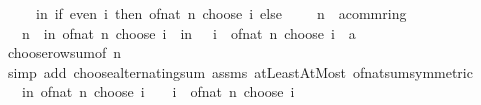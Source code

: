 \begin{isabellebody}
\ \ \ {\isachardoublequoteopen}{}\ {\isacharasterisk}{\kern0pt}\ {\isacharparenleft}{\kern0pt}{\isasymSum}i{\isasymle}n{\isachardot}{\kern0pt}\ if\ even\ i\ then\ of{\isacharunderscore}{\kern0pt}nat\ {\isacharparenleft}{\kern0pt}n\ choose\ i{\isacharparenright}{\kern0pt}\ else\ {}{\isacharparenright}{\kern0pt}\ {\isacharequal}{\kern0pt}\ {\isacharparenleft}{\kern0pt}{}\ {\isacharcircum}{\kern0pt}\ n\ {\isacharcolon}{\kern0pt}{\isacharcolon}{\kern0pt}\ {\isacharprime}{\kern0pt}a{\isacharcolon}{\kern0pt}{\isacharcolon}{\kern0pt}comm{\isacharunderscore}{\kern0pt}ring{\isacharunderscore}{\kern0pt}{}{\isacharparenright}{\kern0pt}{\isachardoublequoteclose}\isanewline
%
\isadelimproof
%
\endisadelimproof
%
\isatagproof
{}\isamarkupfalse%
\ {\isacharminus}{\kern0pt}\isanewline
\ \ \isamarkupfalse%
\ {\isachardoublequoteopen}{}\ {\isacharcircum}{\kern0pt}\ n\ {\isacharequal}{\kern0pt}\ {\isacharparenleft}{\kern0pt}{\isasymSum}i{\isasymle}n{\isachardot}{\kern0pt}\ of{\isacharunderscore}{\kern0pt}nat\ {\isacharparenleft}{\kern0pt}n\ choose\ i{\isacharparenright}{\kern0pt}{\isacharparenright}{\kern0pt}\ {\isacharplus}{\kern0pt}\ {\isacharparenleft}{\kern0pt}{\isasymSum}i{\isasymle}n{\isachardot}{\kern0pt}\ {\isacharparenleft}{\kern0pt}{\isacharminus}{\kern0pt}{}{\isacharparenright}{\kern0pt}\ {\isacharcircum}{\kern0pt}\ i\ {\isacharasterisk}{\kern0pt}\ of{\isacharunderscore}{\kern0pt}nat\ {\isacharparenleft}{\kern0pt}n\ choose\ i{\isacharparenright}{\kern0pt}\ {\isacharcolon}{\kern0pt}{\isacharcolon}{\kern0pt}\ {\isacharprime}{\kern0pt}a{\isacharparenright}{\kern0pt}{\isachardoublequoteclose}\isanewline
\ \ \ \ \isamarkupfalse%
\ choose{\isacharunderscore}{\kern0pt}row{\isacharunderscore}{\kern0pt}sum{\isacharbrackleft}{\kern0pt}of\ n{\isacharbrackright}{\kern0pt}\isanewline
\ \ \ \ \isamarkupfalse%
\ {\isacharparenleft}{\kern0pt}simp\ add{\isacharcolon}{\kern0pt}\ choose{\isacharunderscore}{\kern0pt}alternating{\isacharunderscore}{\kern0pt}sum\ assms\ atLeast{}AtMost\ of{\isacharunderscore}{\kern0pt}nat{\isacharunderscore}{\kern0pt}sum{\isacharbrackleft}{\kern0pt}symmetric{\isacharbrackright}{\kern0pt}{\isacharparenright}{\kern0pt}\isanewline
\ \ \isamarkupfalse%
\ \isamarkupfalse%
\ {\isachardoublequoteopen}{\isasymdots}\ {\isacharequal}{\kern0pt}\ {\isacharparenleft}{\kern0pt}{\isasymSum}i{\isasymle}n{\isachardot}{\kern0pt}\ of{\isacharunderscore}{\kern0pt}nat\ {\isacharparenleft}{\kern0pt}n\ choose\ i{\isacharparenright}{\kern0pt}\ {\isacharplus}{\kern0pt}\ {\isacharparenleft}{\kern0pt}{\isacharminus}{\kern0pt}{}{\isacharparenright}{\kern0pt}\ {\isacharcircum}{\kern0pt}\ i\ {\isacharasterisk}{\kern0pt}\ of{\isacharunderscore}{\kern0pt}nat\ {\isacharparenleft}{\kern0pt}n\ choose\ i{\isacharparenright}{\kern0pt}{\isacharparenright}{\kern0pt}{\isachardoublequoteclose}\isanewline

\end{isabellebody}
